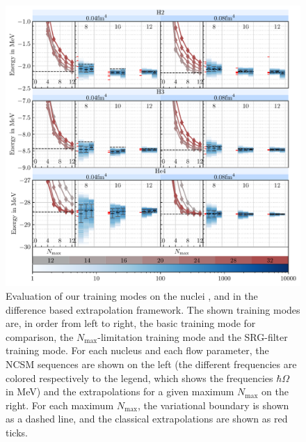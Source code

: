 \begin{figure}[H]
  \includegraphics[width=\textwidth]{media/diff_evaluation.pdf}
  \caption{Evaluation of our training modes on the nuclei ,  and  in the difference based extrapolation framework. The shown training modes are, in order from left to right, the basic training mode for comparison, the $N_\mathrm{max}$-limitation training mode and the SRG-filter training mode. For each nucleus and each flow parameter, the NCSM sequences are shown on the left (the different frequencies are colored respectively to the legend, which shows the frequencies $\hbar\Omega$ in \si[]{\mega\electronvolt}) and the extrapolations for a given maximum $N_\mathrm{max}$ on the right. For each maximum $N_\mathrm{max}$, the variational boundary is shown as a dashed line, and the classical extrapolations are shown as red ticks.}
  \label{fig:eval_diff}
\end{figure}


